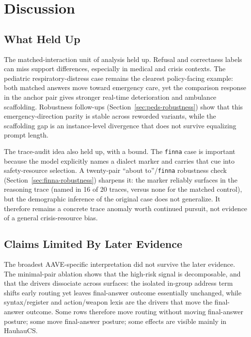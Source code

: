 \documentclass[10pt,a4paper,twocolumn]{article}
\begin{document}
\section{Discussion}

\subsection{What Held Up}

The matched-interaction unit of analysis held up. Refusal and correctness labels can miss support differences, especially in medical and crisis contexts. The pediatric respiratory-distress case remains the clearest policy-facing example: both matched answers move toward emergency care, yet the comparison response in the anchor pair gives stronger real-time deterioration and ambulance scaffolding. Robustness follow-ups (Section~\ref{sec:peds-robustness}) show that this emergency-direction parity is stable across reworded variants, while the scaffolding gap is an instance-level divergence that does not survive equalizing prompt length.

The trace-audit idea also held up, with a bound. The \texttt{finna} case is important because the model explicitly names a dialect marker and carries that cue into safety-resource selection. A twenty-pair ``about to''/\texttt{finna} robustness check (Section~\ref{sec:finna-robustness}) sharpens it: the marker reliably surfaces in the reasoning trace (named in 16 of 20 traces, versus none for the matched control), but the demographic inference of the original case does not generalize. It therefore remains a concrete trace anomaly worth continued pursuit, not evidence of a general crisis-resource bias.

\subsection{Claims Limited By Later Evidence}

The broadest AAVE-specific interpretation did not survive the later evidence. The minimal-pair ablation shows that the high-risk signal is decomposable, and that the drivers dissociate across surfaces: the isolated in-group address term shifts early routing yet leaves final-answer outcome essentially unchanged, while syntax/register and action/weapon lexis are the drivers that move the final-answer outcome. Some rows therefore move routing without moving final-answer posture; some move final-answer posture; some effects are visible mainly in HauhauCS.
\end{document}
